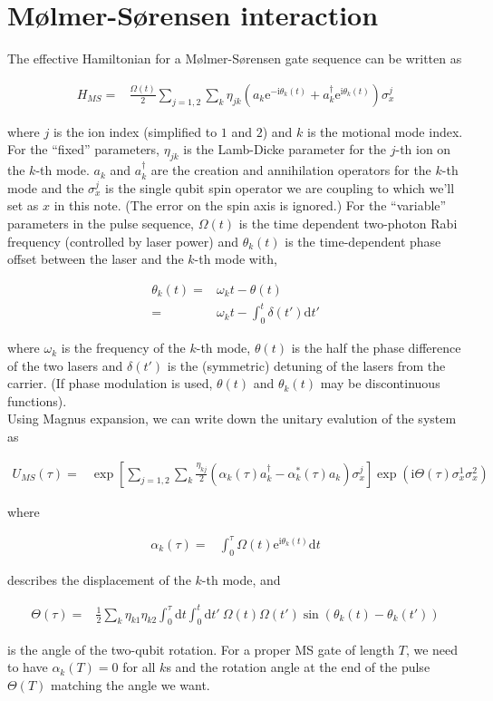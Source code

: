 \documentclass[10pt,fleqn]{article}
\newcommand{\ud}{\mathrm{d}}
\newcommand{\ue}{\mathrm{e}}
\newcommand{\ui}{\mathrm{i}}
\newcommand{\eqar}[1]
{
  \begin{align*}
    #1
  \end{align*}
}
\newcommand{\paren}[1]{{\left({#1}\right)}}
\newcommand{\sqr}[1]{{\left[{#1}\right]}}
\begin{document}
\section{M{\o}lmer-S{\o}rensen interaction}
The effective Hamiltonian for a M{\o}lmer-S{\o}rensen gate sequence can be written as
\eqar{
  H_{MS}=&\frac{\Omega(t)}{2}\sum_{j=1,2}\sum_{k}\eta_{jk}\paren{a_k\ue^{-\ui\theta_k(t)}+a_k^\dagger\ue^{\ui\theta_k(t)}}\sigma^j_x
}
where $j$ is the ion index (simplified to $1$ and $2$)
and $k$ is the motional mode index.
For the ``fixed'' parameters, $\eta_{jk}$ is the Lamb-Dicke parameter for the $j$-th
ion on the $k$-th mode. $a_k$ and $a^\dagger_k$ are the creation and annihilation
operators for the $k$-th mode and the $\sigma_x^j$ is the single qubit spin operator
we are coupling to which we'll set as $x$ in this note.
(The error on the spin axis is ignored.)
For the ``variable'' parameters in the pulse sequence,
$\Omega(t)$ is the time dependent two-photon Rabi frequency (controlled by laser power)
and $\theta_k(t)$ is the time-dependent phase offset between the laser and the $k$-th
mode with,
\eqar{
  \theta_k(t)=&\omega_kt-\theta(t)\\
  =&\omega_kt-\int_0^t\delta(t')\ud t'
}
where $\omega_k$ is the frequency of the $k$-th mode,
$\theta(t)$ is the half the phase difference of the two lasers
and $\delta(t')$ is the (symmetric) detuning of the lasers from the carrier.
(If phase modulation is used, $\theta(t)$ and $\theta_k(t)$
may be discontinuous functions).\\

Using Magnus expansion, we can write down the unitary evalution of the system as
\eqar{
  U_{MS}(\tau)=&\exp\sqr{\sum_{j=1,2}\sum_{k}\frac{\eta_{kj}}{2}\paren{\alpha_k(\tau)a^\dagger_k-\alpha^*_k(\tau)a_k}\sigma^j_x}\exp\paren{\ui\Theta(\tau)\sigma^1_x\sigma^2_x}
}
where
\eqar{
  \alpha_k(\tau)=&\int_0^\tau\Omega(t)\ue^{\ui\theta_k(t)}\ud t
}
describes the displacement of the $k$-th mode, and
\eqar{
  \Theta(\tau)=&\frac{1}{2}\sum_k\eta_{k1}\eta_{k2}\int_0^\tau\!\!\ud t\int_0^t\!\!\ud t'
  \ \Omega(t)\Omega(t')\sin(\theta_k(t)-\theta_k(t'))
}
is the angle of the two-qubit rotation. For a proper MS gate of length $T$,
we need to have $\alpha_k(T)=0$ for all $k$s and the rotation angle
at the end of the pulse $\Theta(T)$ matching the angle we want.\\
\end{document}
